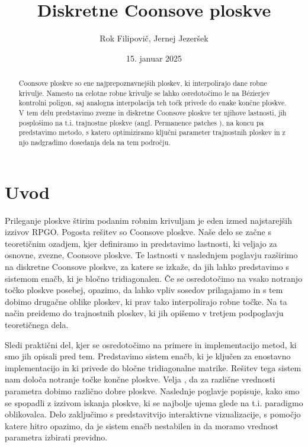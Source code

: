 \documentclass[twocolumn, 10pt]{article}    %
\title{Diskretne Coonsove ploskve}
\author{Rok Filipovič, Jernej Jezeršek}
\date{15. januar 2025}
\begin{document}
\maketitle

\begin{abstract}
Coonsove ploskve\cite{coons1967} so ene najprepoznavnejših ploskev, ki interpolirajo dane robne krivulje. 
Namesto na celotne robne krivulje se lahko osredotočimo le na Bézierjev kontrolni poligon, saj analogna interpolacija teh točk privede do enake končne ploskve. 
V tem delu predstavimo zvezne in diskretne Coonsove ploskve ter njihove lastnosti, jih posplošimo na t.i. trajnostne ploskve (angl. Permanence patches \cite{FARIN1999691}), na koncu pa predstavimo metodo, s katero optimiziramo ključni parameter trajnostnih ploskev in z njo nadgradimo dosedanja dela na tem področju.
\end{abstract}

\section{Uvod}
Prileganje ploskve štirim podanim robnim krivuljam je eden izmed najstarejših izzivov RPGO.
Pogosta rešitev so Coonsove ploskve.
Naše delo se začne s teoretičnim ozadjem, kjer definiramo in predstavimo lastnosti, ki veljajo za osnovne, zvezne, Coonsove ploskve. 
Te lastnosti v naslednjem poglavju razširimo na diskretne Coonsove ploskve, za katere se izkaže, da jih lahko predstavimo s sistemom enačb, ki je bločno tridiagonalen. 
Če se osredotočimo na vsako notranjo točko ploskve posebej, opazimo, da lahko vpliv sosedov prilagajamo in s tem dobimo drugačne oblike ploskev, ki prav tako interpolirajo robne točke.
Na ta način preidemo do trajnostnih ploskev, ki jih opišemo v tretjem podpoglavju teoretičnega dela.

Sledi praktični del, kjer se osredotočimo na primere in implementacijo metod, ki smo jih opisali pred tem.
Predstavimo sistem enačb, ki je ključen za enostavno implementacijo in ki privede do bločne tridiagonalne matrike.
Rešitev tega sistem nam določa notranje točke končne ploskve.
Velja \cite{FARIN1999691}, da za različne vrednosti parametra dobimo različno dobre ploskve.
Naslednje poglavje popisuje, kako smo se spopadli z izzivom iskanja ploskve, ki se najbolje ujema glede na t.i. paradigmo oblikovalca.
Delo zaključimo s predstavitvijo interaktivne vizualizacije, s pomočjo katere hitro opazimo, da je sistem enačb nestabilen in da moramo vrednost parametra izbirati previdno.
\end{document}
